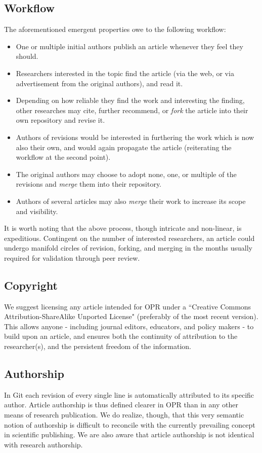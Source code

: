 \subsection{Workflow}
The aforementioned emergent properties owe to the following workflow:
\begin{itemize}
	\item One or multiple initial authors publish an article whenever they feel they should.
	\item Researchers interested in the topic find the article (via the web, or via advertisement from the original authors), and read it.
	\item Depending on how reliable they find the work and interesting the finding, other researches may cite, further recommend, or \textit{fork} the article into their own repository and revise it.
	\item Authors of revisions would be interested in furthering the work which is now also their own, and would again propagate the article (reiterating the workflow at the second point).
	\item The original authors may choose to adopt none, one, or multiple of the revisions and \textit{merge} them into their repository.
	\item Authors of several articles may also \textit{merge} their work to increase its scope and visibility.
\end{itemize}
It is worth noting that the above process, though intricate and non-linear, is expeditious.
Contingent on the number of interested researchers, an article could undergo manifold circles of revision, forking, and merging in the months usually required for validation through peer review.
\subsection{Copyright}
We suggest licensing any article intended for OPR under a ``Creative Commons Attribution-ShareAlike Unported License" (preferably of the most recent version).
This allows anyone - including journal editors, educators, and policy makers - to build upon an article, and ensures both the continuity of attribution to the researcher(s), and the persistent freedom of the information.
\subsection{Authorship}
In Git each revision of every single line is automatically attributed to its specific author.
Article authorship is thus defined clearer in OPR than in any other means of research publication.
We do realize, though, that this very semantic notion of authorship is difficult to reconcile with the currently prevailing concept in scientific publishing.
We are also aware that article authorship is not identical with research authorship.

